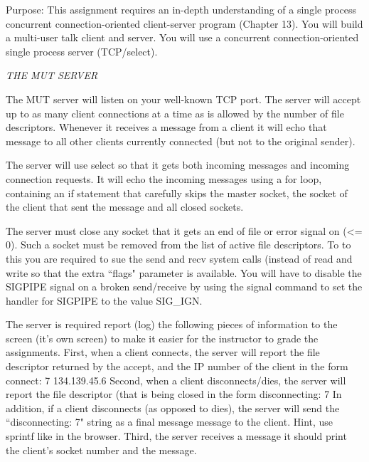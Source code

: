 

\parindent 0pt

Purpose: This assignment requires an in-depth understanding of
a single process concurrent connection-oriented client-server program 
(Chapter 13).
You will build a multi-user talk client and server.
You will use a concurrent connection-oriented single process server 
(TCP/select).

{\it THE MUT SERVER}

The MUT server will listen on your well-known TCP port.
The server will accept up to as many client connections at a time as is
allowed by the number of file descriptors.
Whenever it receives a message from a client it will echo that message
to all other clients currently connected (but not to the original sender).

The server will use select so that it gets both incoming
messages and incoming connection requests.
It will echo the incoming messages using a for loop, containing
an if statement that carefully skips the master socket, the socket of the
client that sent the message and all closed sockets.

The server must close any socket that it gets
an end of file or error signal on ({\ltt{}<= 0}).
Such a socket must be removed from the list of active file descriptors.
To to this you are required to sue the {\ltt{}send} and {\ltt{}recv}
system calls (instead of {\ltt{}read} and {\ltt{}write} so that
the extra ``flags" parameter is available.
You will have to disable the {\ltt{}SIGPIPE} signal on
a broken send/receive 
by using the {\ltt{}signal} command to set the handler for {\ltt{}SIGPIPE}
to the value {\ltt{}SIG_IGN}.

The server is required  report (log) the following pieces of information to
the screen (it's own screen) to make it easier for the
instructor to grade the assignments.
First, when a client connects, 
the server will report the file descriptor
returned by the accept, and the IP number of the client
in the form\hfill\break
{\ltt{}connect: 7 134.139.45.6}
\hfill\break
Second, when a client disconnects/dies, the server will report the file
descriptor (that is being closed
in the form\hfill\break
{\ltt{}disconnecting: 7}
\hfill\break
In addition, if a client disconnects (as opposed to dies), the
server will send the ``disconnecting: 7" string as a final message message
to the client. Hint, use {\ltt{}sprintf} like in the browser.
\hfill\break
Third, the server receives a message it should print the client's
socket number and the message.

